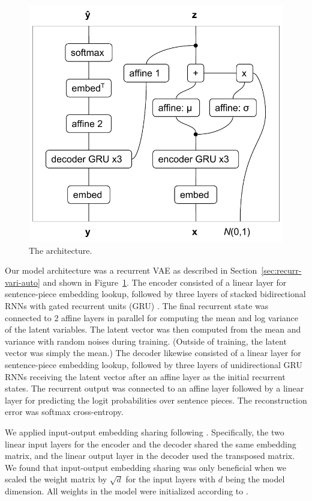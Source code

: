 \documentclass[11pt]{article}
\begin{document}
\begin{figure}
  \centering\includegraphics[width=0.7\linewidth]{arch.pdf}
  \caption[]{\label{fig:arch}The architecture.}
\end{figure}

Our model architecture was a recurrent VAE
as described in Section~\ref{sec:recurr-vari-auto} and shown in Figure~\ref{fig:arch}.
The encoder consisted of a linear layer for sentence-piece embedding lookup,
followed by three layers of stacked bidirectional RNNs with gated recurrent units (GRU) \parencite{cho2014learning}.
The final recurrent state was connected to 2 affine layers in parallel
for computing the mean and log variance of the latent variables.
The latent vector was then computed from the mean and variance with random noises during training.
(Outside of training, the latent vector was simply the mean.)
The decoder likewise consisted of a linear layer for sentence-piece embedding lookup,
followed by three layers of unidirectional GRU RNNs
receiving the latent vector after an affine layer as the initial recurrent states.
The recurrent output was connected to an affine layer
followed by a linear layer for predicting the logit probabilities over sentence pieces.
The reconstruction error was softmax cross-entropy.

We applied input-output embedding sharing following \textcite{press2016using}.
Specifically, the two linear input layers for the encoder and the decoder shared the same embedding matrix,
and the linear output layer in the decoder used the transposed matrix.
We found that input-output embedding sharing was only beneficial
when we scaled the weight matrix by \(\sqrt{d}\) for the input layers
with \(d\) being the model dimension.
All weights in the model were initialized according to \textcite{glorot2010understanding}.
\end{document}
